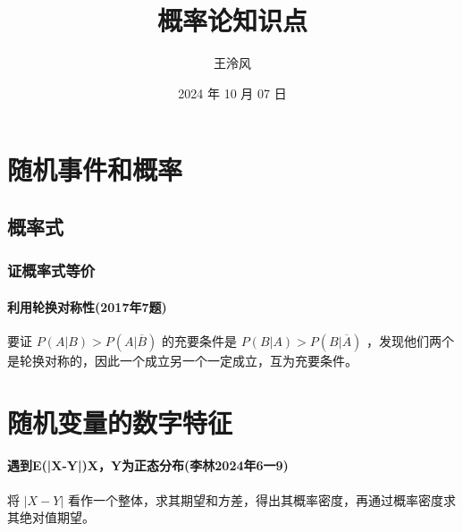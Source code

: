 \documentclass[a4paper,12pt,UTF8]{ctexart}
\begin{document}
    \title{概率论知识点}
    \author{王泠风}
    \date{2024 年 10 月 07 日}
    \maketitle

    \section{随机事件和概率}

    \subsection{概率式}

    \subsubsection{证概率式等价}

    \paragraph{利用轮换对称性(2017年7题)}
    要证 \(P(A|B)>P(A|\overline{B})\) 的充要条件是 \(P(B|A)>P(B|\overline{A})\) ，发现他们两个是轮换对称的，因此一个成立另一个一定成立，互为充要条件。

    \section{随机变量的数字特征}

    \paragraph{遇到E(|X-Y|)X，Y为正态分布(李林2024年6一9)} 将 \(\left| X-Y \right| \) 看作一个整体，求其期望和方差，得出其概率密度，再通过概率密度求其绝对值期望。
\end{document}
